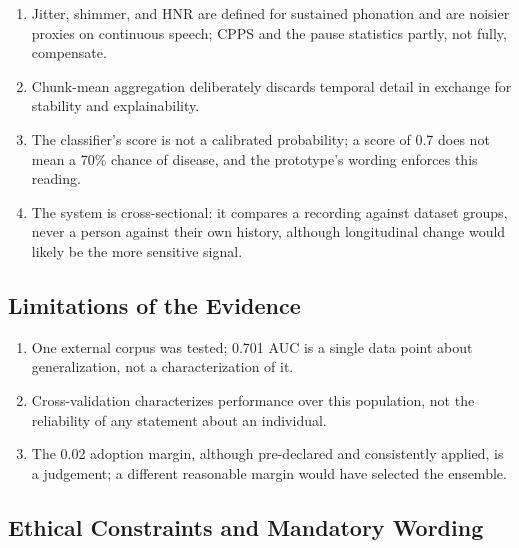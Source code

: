 \begin{enumerate}
  \item Jitter, shimmer, and HNR are defined for sustained phonation
        and are noisier proxies on continuous speech; CPPS and the
        pause statistics partly, not fully, compensate.
  \item Chunk-mean aggregation deliberately discards temporal detail in
        exchange for stability and explainability.
  \item The classifier's score is not a calibrated probability; a score
        of 0.7 does not mean a 70\% chance of disease, and the
        prototype's wording enforces this reading.
  \item The system is cross-sectional: it compares a recording against
        dataset groups, never a person against their own history,
        although longitudinal change would likely be the more
        sensitive signal.
\end{enumerate}

\subsection{Limitations of the Evidence}

\begin{enumerate}
  \item One external corpus was tested; 0.701 AUC is a single data
        point about generalization, not a characterization of it.
  \item Cross-validation characterizes performance over this
        population, not the reliability of any statement about an
        individual.
  \item The 0.02 adoption margin, although pre-declared and
        consistently applied, is a judgement; a different reasonable
        margin would have selected the ensemble.
\end{enumerate}

\subsection{Ethical Constraints and Mandatory Wording}

